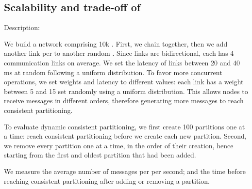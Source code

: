 \subsection{Scalability and trade-off of \NAME}
\begin{asparadesc}
  
\item [Description:]
  
We build a network comprising 10k \processes. First, we chain
\processes together, then we add another link per
\process to another random \process. Since links are bidirectional,
each \process has 4 communication links on average. We set the latency
of links between 20 and 40 ms at random following a uniform
distribution.
%
To favor more concurrent operations, we %
set
weights and latency to different values: each link has a weight
between 5 and 15 set randomly using a uniform distribution. This
allows nodes to receive messages in different orders, %
therefore generating more messages to reach consistent
partitioning.


\noindent To evaluate dynamic consistent partitioning, we first
create 100 partitions one at a time: \processes reach consistent
partitioning before we create each new partition. Second, we remove
every partition one at a time, in the order of their creation, hence
starting from the first and oldest partition that had been added.

\noindent We measure the average number of messages %
per
\process per second; and the time before reaching consistent
partitioning after adding or removing a partition.




\end{asparadesc}
